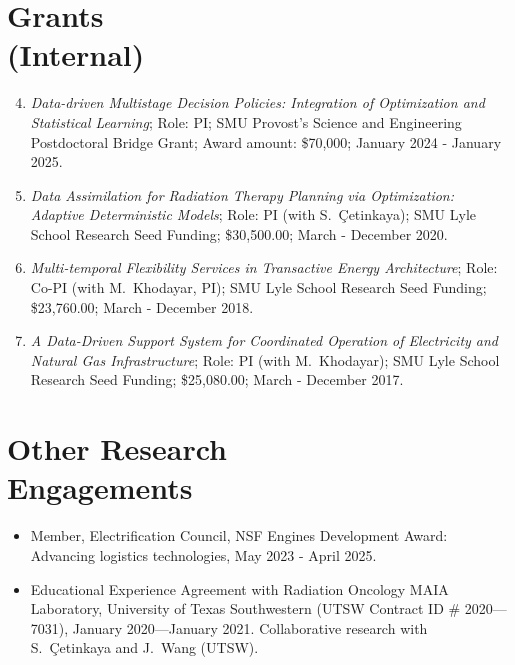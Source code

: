 \documentclass[hyperref, margin]{myResume}
\begin{document}
\begin{resume}
\section{Grants\\(Internal)}
\begin{enumerate}[label=G\arabic*., leftmargin=*] \setcounter{enumi}{3}
	\item \emph{Data-driven Multistage Decision Policies: Integration of Optimization and Statistical Learning}; Role: PI; SMU Provost's Science and Engineering Postdoctoral Bridge Grant; Award amount: \$70,000; January 2024 - January 2025.
	\item \emph{Data Assimilation for Radiation Therapy Planning via Optimization: Adaptive Deterministic Models}; Role: PI (with S.\ \c{C}etinkaya); SMU Lyle School Research Seed Funding; \$30,500.00; March - December 2020.
	\item \emph{Multi-temporal Flexibility Services in Transactive Energy Architecture}; Role: Co-PI (with M.\ Khodayar, PI); SMU Lyle School Research Seed Funding; \$23,760.00; March - December 2018.
	\item \emph{A Data-Driven Support System for Coordinated Operation of Electricity and Natural Gas Infrastructure}; Role: PI (with M.\ Khodayar); SMU Lyle School Research Seed Funding; \$25,080.00; March - December 2017.
\end{enumerate}


\section{Other Research\\Engagements}
\begin{itemize}[leftmargin=17pt]
	\item Member, Electrification Council, NSF Engines Development Award: Advancing logistics technologies, May 2023 - April 2025.
	\item Educational Experience Agreement with Radiation Oncology MAIA Laboratory, University of Texas Southwestern (UTSW Contract ID \# 2020—7031), January 2020—January 2021. Collaborative research with S.\ \c{C}etinkaya and J.\ Wang (UTSW).
\end{itemize}


\end{resume}
\end{document}
